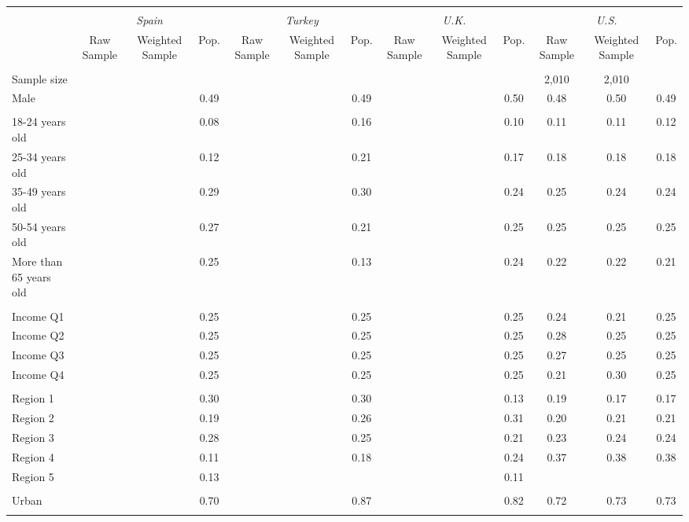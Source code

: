 \begin{tabular}{l*{12}{c}}
\toprule
\hline \\[-1.8ex]
\multicolumn{1}{c}{\em{ }} & \multicolumn{3}{c}{\em{Spain}} & \multicolumn{3}{c}{\em{Turkey}} & \multicolumn{3}{c}{\em{U.K.}} & \multicolumn{3}{c}{\em{U.S.}} \\
\cmidrule(l{3pt}r{3pt}){2-4} \cmidrule(l{3pt}r{3pt}){5-7} \cmidrule(l{3pt}r{3pt}){8-10} \cmidrule(l{3pt}r{3pt}){11-13}
\noalign{\smallskip}  & Raw Sample & Weighted Sample & Pop. & Raw Sample & Weighted Sample & Pop. & Raw Sample & Weighted Sample & Pop. & Raw Sample & Weighted Sample & Pop. \\
\hline \\[-1.8ex] 
Sample size & & & & & & & & & & 2,010 & 2,010 & \\
\noalign{\smallskip}\hline \noalign{\smallskip}Male & & & 0.49 & & & 0.49 & & & 0.50 & 0.48 & 0.50 & 0.49 \\ 
\\
18-24 years old & & & 0.08 & & & 0.16 & & & 0.10 & 0.11 & 0.11 & 0.12 \\
25-34 years old & & & 0.12 & & & 0.21 & & & 0.17 & 0.18 & 0.18 & 0.18 \\
35-49 years old & & & 0.29 & & & 0.30 & & & 0.24 & 0.25 & 0.24 & 0.24 \\
50-54 years old & & & 0.27 & & & 0.21 & & & 0.25 & 0.25 & 0.25 & 0.25 \\
More than 65 years old & & & 0.25 & & & 0.13 & & & 0.24 & 0.22 & 0.22 & 0.21 \\ 
\\
Income Q1 & & & 0.25 & & & 0.25 & & & 0.25 & 0.24 & 0.21 & 0.25 \\
Income Q2 & & & 0.25 & & & 0.25 & & & 0.25 & 0.28 & 0.25 & 0.25 \\
Income Q3 & & & 0.25 & & & 0.25 & & & 0.25 & 0.27 & 0.25 & 0.25 \\
Income Q4 & & & 0.25 & & & 0.25 & & & 0.25 & 0.21 & 0.30 & 0.25 \\
\\
Region 1 & & & 0.30 & & & 0.30 & & & 0.13 & 0.19 & 0.17 & 0.17 \\
Region 2 & & & 0.19 & & & 0.26 & & & 0.31 & 0.20 & 0.21 & 0.21 \\
Region 3 & & & 0.28 & & & 0.25 & & & 0.21 & 0.23 & 0.24 & 0.24 \\
Region 4 & & & 0.11 & & & 0.18 & & & 0.24 & 0.37 & 0.38 & 0.38 \\
Region 5 & & & 0.13 & & & & & & 0.11 & & & \\
\\
Urban & & & 0.70 & & & 0.87 & & & 0.82 & 0.72 & 0.73 & 0.73 \\
\\
\bottomrule
\end{tabular}